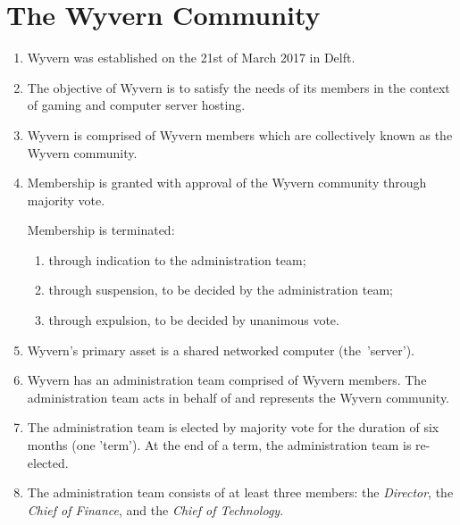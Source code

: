 \section{The Wyvern Community}
\label{sec:wyvern-community}
\begin{enumerate}
    \item Wyvern was established on the 21st of March 2017 in Delft.

    \item The objective of Wyvern is to satisfy the needs of its members in the context of gaming and computer server hosting.

    \item Wyvern is comprised of Wyvern members which are collectively known as the Wyvern community.

    \item Membership is granted with approval of the Wyvern community through majority vote.
    
    \begin{item}
        Membership is terminated:
        \begin{enumerate}
            \item through indication to the administration team;
            \item through suspension, to be decided by the administration team;
            \item through expulsion, to be decided by unanimous vote.
        \end{enumerate}
    \end{item}

    \item Wyvern's primary asset is a shared networked computer (the~'server').

    \item Wyvern has an administration team comprised of Wyvern members. The administration team acts in behalf of and represents the Wyvern community.

    \item The administration team is elected by majority vote for the duration of six months (one 'term'). At the end of a term, the administration team is re-elected.

    \item The administration team consists of at least three members: the \emph{Director}, the \emph{Chief of Finance}, and the \emph{Chief of Technology}.


\end{enumerate}
